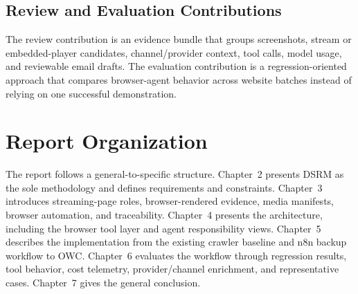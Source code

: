 \subsection{Review and Evaluation Contributions}

The review contribution is an evidence bundle that groups screenshots, stream
or embedded-player candidates, channel/provider context, tool calls, model
usage, and reviewable email drafts. The evaluation contribution is a
regression-oriented approach that compares browser-agent behavior across
website batches instead of relying on one successful demonstration.

\section{Report Organization}

The report follows a general-to-specific structure. Chapter~2 presents DSRM as
the sole methodology and defines requirements and constraints. Chapter~3
introduces streaming-page roles, browser-rendered evidence, media manifests,
browser automation, and traceability. Chapter~4 presents the architecture,
including the browser tool layer and agent responsibility views. Chapter~5
describes the implementation from the existing crawler baseline and n8n backup
workflow to OWC. Chapter~6 evaluates the workflow through regression results,
tool behavior, cost telemetry, provider/channel enrichment, and representative
cases. Chapter~7 gives the general conclusion.



